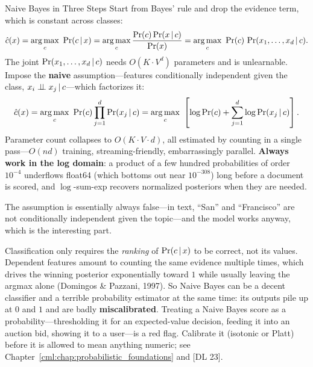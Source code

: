 \begin{mathresult}{Naive Bayes in Three Steps}
Start from Bayes' rule and drop the evidence term, which is constant across classes:
\begin{equation}
\hat c(x) = \argmax_{c}\ \Pr(c \given x) = \argmax_c \frac{\Pr(c)\Pr(x\given c)}{\Pr(x)} = \argmax_c\ \Pr(c)\,\Pr(x_1,\dots,x_d \given c).
\end{equation}
The joint $\Pr(x_1,\dots,x_d\,|\, c)$ needs $O(K\cdot V^d)$ parameters and is unlearnable. Impose the \textbf{naive} assumption---features conditionally independent given the class, $x_i \perp \!\!\! \perp x_j \,|\, c$---which factorizes it:
\begin{equation}
\hat c(x) = \argmax_c\ \Pr(c)\prod_{j=1}^{d}\Pr(x_j \given c)
= \argmax_c\ \left[\log \Pr(c) + \sum_{j=1}^{d}\log \Pr(x_j\given c)\right] .
\end{equation}
Parameter count collapses to $O(K\cdot V\cdot d)$, all estimated by counting in a single pass---$O(nd)$ training, streaming-friendly, embarrassingly parallel. \textbf{Always work in the log domain}: a product of a few hundred probabilities of order $10^{-4}$ underflows float64 (which bottoms out near $10^{-308}$) long before a document is scored, and $\log$-sum-exp recovers normalized posteriors when they are needed.
\end{mathresult}

The assumption is essentially always false---in text, ``San'' and ``Francisco'' are not conditionally independent given the topic---and the model works anyway, which is the interesting part.

\begin{keyinsight}
Classification only requires the \emph{ranking} of $\Pr(c\,|\, x)$ to be correct, not its values. Dependent features amount to counting the same evidence multiple times, which drives the winning posterior exponentially toward $1$ while usually leaving the argmax alone (Domingos \& Pazzani, 1997). So Naive Bayes can be a decent classifier and a terrible probability estimator at the same time: its outputs pile up at $0$ and $1$ and are badly \textbf{miscalibrated}. Treating a Naive Bayes score as a probability---thresholding it for an expected-value decision, feeding it into an auction bid, showing it to a user---is a red flag. Calibrate it (isotonic or Platt) before it is allowed to mean anything numeric; see Chapter~\ref{cml:chap:probabilistic_foundations} and [DL 23].
\end{keyinsight}

